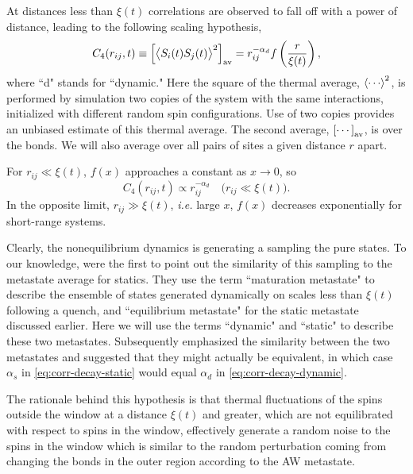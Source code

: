 At distances less than $\xi(t)$ correlations are observed to fall off with a
power of distance, leading to the following scaling hypothesis,
\begin{equation}
  C_4(r_{ij},t)
  \equiv \left[\left< S_i(t) S_j(t) \right>^2\right]_{\mathrm{av}}
  =  r_{ij}^{-\alpha_d} f \left(\frac{r}{\xi(t)}\right),
  \label{eq:c4-scaling}
\end{equation}
where ``d" stands for ``dynamic." Here the square of the thermal average,
$\av{\cdots}^2$, is performed by simulation two copies of the system with the
same interactions, initialized with different random spin configurations.
Use of two copies provides an unbiased estimate of this thermal average.
The second average, $\left[\cdots\right]_{\mathrm{av}}$, is over the bonds. We will also average over
all pairs of sites a given distance $r$ apart.

For $r_{ij} \ll \xi(t)$, $f(x)$ approaches a constant as $x \to 0$, so
\begin{equation}
  C_4(r_{ij},t) \propto r_{ij}^{-\alpha_d}
  \quad\text{($r_{ij} \ll \xi(t)$)}.
  \label{eq:corr-decay-dynamic}
\end{equation}
In the opposite limit, $r_{ij} \gg \xi(t)$, \emph{i.e.} large $x$, $f(x)$
decreases exponentially for short-range systems.

Clearly, the nonequilibrium dynamics is generating a sampling the pure states.
To our knowledge, \textcite{white2006scenario} were the first to point out the
similarity of this sampling to the metastate average for statics. They use the
term ``maturation metastate" to describe the ensemble of states generated
dynamically on scales less than $\xi(t)$ following a quench, and ``equilibrium
metastate" for the static metastate discussed earlier. Here we will use the
terms ``dynamic" and ``static" to describe these two metastates. Subsequently
\textcite{manssen2015nonequilibrium} emphasized the similarity between the two
metastates and suggested that they might actually be equivalent, in which case
$\alpha_s$ in \cref{eq:corr-decay-static} would equal $\alpha_d$ in
\cref{eq:corr-decay-dynamic}.

The rationale behind this hypothesis is that thermal fluctuations of the spins
outside the window at a distance $\xi(t)$ and greater, which are not
equilibrated with respect to spins in the window, effectively generate a random
noise to the spins in the window which is similar to the random perturbation
coming from changing the bonds in the outer region according to the AW
metastate.

